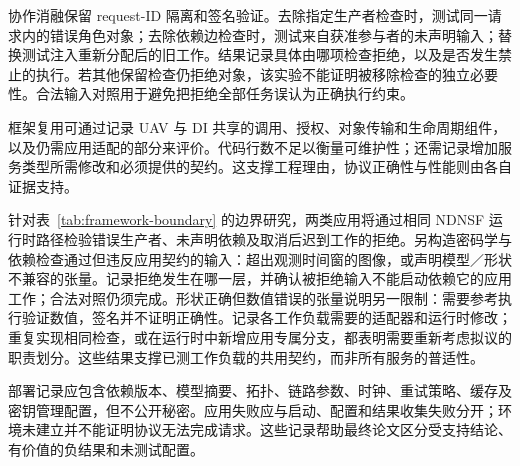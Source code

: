 协作消融保留 request-ID 隔离和签名验证。去除指定生产者检查时，测试同一请求内的错误角色对象；去除依赖边检查时，测试来自获准参与者的未声明输入；替换测试注入重新分配后的旧工作。结果记录具体由哪项检查拒绝，以及是否发生禁止的执行。若其他保留检查仍拒绝对象，该实验不能证明被移除检查的独立必要性。合法输入对照用于避免把拒绝全部任务误认为正确执行约束。

框架复用可通过记录 UAV 与 DI 共享的调用、授权、对象传输和生命周期组件，以及仍需应用适配的部分来评价。代码行数不足以衡量可维护性；还需记录增加服务类型所需修改和必须提供的契约。这支撑工程理由，协议正确性与性能则由各自证据支持。

针对表~\ref{tab:framework-boundary} 的边界研究，两类应用将通过相同 NDNSF 运行时路径检验错误生产者、未声明依赖及取消后迟到工作的拒绝。另构造密码学与依赖检查通过但违反应用契约的输入：超出观测时间窗的图像，或声明模型／形状不兼容的张量。记录拒绝发生在哪一层，并确认被拒绝输入不能启动依赖它的应用工作；合法对照仍须完成。形状正确但数值错误的张量说明另一限制：需要参考执行验证数值，签名并不证明正确性。记录各工作负载需要的适配器和运行时修改；重复实现相同检查，或在运行时中新增应用专属分支，都表明需要重新考虑拟议的职责划分。这些结果支撑已测工作负载的共用契约，而非所有服务的普适性。

部署记录应包含依赖版本、模型摘要、拓扑、链路参数、时钟、重试策略、缓存及密钥管理配置，但不公开秘密。应用失败应与启动、配置和结果收集失败分开；环境未建立并不能证明协议无法完成请求。这些记录帮助最终论文区分受支持结论、有价值的负结果和未测试配置。
